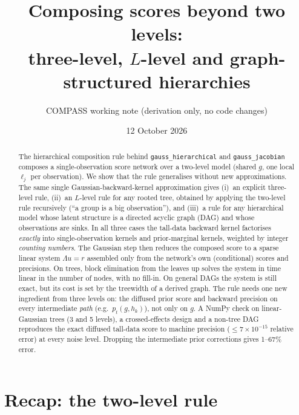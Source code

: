 \documentclass[11pt]{article}
\title{Composing scores beyond two levels:\\
three-level, $L$-level and graph-structured hierarchies}
\author{COMPASS working note (derivation only, no code changes)}
\date{12 October 2026}
\theoremstyle{definition}
\theoremstyle{remark}
\newcommand{\arrowm}{\texttt{gauss\_hierarchical}}
\newcommand{\quiver}{\texttt{gauss\_jacobian}}
\begin{document}
\maketitle

\begin{abstract}
The hierarchical composition rule behind \arrowm{} and \quiver{} composes a
single-observation score network over a two-level model (shared $g$, one local
$\ell_j$ per observation). We show that the rule generalises without new
approximations. The same single Gaussian-backward-kernel approximation gives
(i)~an explicit three-level rule, (ii)~an $L$-level rule for any rooted tree,
obtained by applying the two-level rule recursively (``a group is a big
observation''), and (iii)~a rule for any hierarchical model whose latent
structure is a directed acyclic graph (DAG) and whose observations are sinks. In
all three cases the tall-data backward kernel factorises \emph{exactly} into
single-observation kernels and prior-marginal kernels, weighted by integer
\emph{counting numbers}. The Gaussian step then reduces the composed score to a
sparse linear system $\Lambda u=r$ assembled only from the network's own
(conditional) scores and precisions. On trees, block elimination from the leaves
up solves the system in time linear in the number of nodes, with no fill-in.
On general DAGs the system is still exact, but its cost is set by the treewidth
of a derived graph. The rule needs one new ingredient from three levels on: the
diffused prior score and backward precision on every intermediate
\emph{path} (e.g.\ $p_t(g,h_k)$), not only on $g$. A NumPy check on
linear-Gaussian trees (3 and 5 levels), a crossed-effects design and a non-tree
DAG reproduces the exact diffused tall-data score to machine precision
($\le 7\times10^{-15}$ relative error) at every noise level. Dropping the
intermediate prior corrections gives 1--67\% error.
\end{abstract}

\tableofcontents

\section{Recap: the two-level rule}\label{sec:recap}
\end{document}
